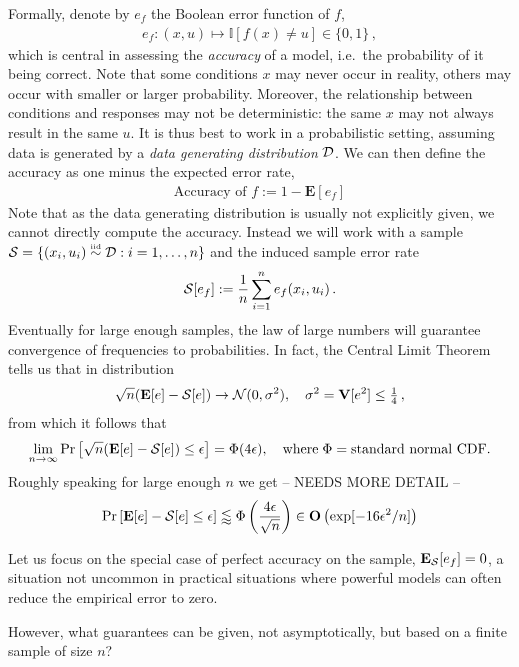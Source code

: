 \documentclass[12pt,a4paper]{article}
\begin{document}
\noindent Formally, denote by $e_f$ the Boolean error function of $f$,
\begin{align}
    e_f: (x,u) \mapsto \mathbb{I}[f(x) \neq u] \in \{0,1\}\,,
\end{align}
which is central in assessing the  \textit{accuracy} of a model, i.e.~the probability of it being correct. Note that some conditions $x$ may never occur in reality, others may occur with smaller or larger probability. Moreover, the relationship between conditions and responses may not be deterministic: the same $x$ may not always result in the same $u$.  It is thus best to work in a probabilistic setting, assuming data is generated by a  \textit{data generating distribution} $\mathcal D$. We can then define the accuracy as one minus the expected error rate, 
\begin{align}
    \text{Accuracy of $f$} := 1- \mathbf{E}[e_f]
\end{align}
Note that as the data generating distribution is usually not explicitly given, we cannot directly compute the accuracy. Instead we will work with a sample $\mathcal{S}= \{(x_i,u_i) \stackrel{\text{\tiny  iid}}\sim \mathcal D: i=1,\dots,n\}$ and the induced  sample error rate 
\begin{align}
    \mathcal {S}[e_f] := \frac{1}{n} \sum_{i=1}^n e_f(x_i,u_i)\,.
\end{align}
Eventually for large enough samples, the law of large numbers will guarantee convergence of frequencies to probabilities. In fact, the Central Limit Theorem tells us that in distribution 
\begin{align}
\sqrt n (\mathbf E[e] - \mathcal S[e]) \stackrel{}\to \mathcal N(0,\sigma^2), \quad \sigma^2 = \mathbf{V}[e^2] \le \tfrac 14\,,
\end{align}
from which it follows that
\begin{align}
\lim_{n \to \infty} \Pr\left[ \sqrt n (\mathbf E[e] - \mathcal S[e] ) \le \epsilon \right] = \Phi(4\epsilon), \quad \text{where} \; \Phi = \text{standard normal CDF}.
\end{align}
Roughly speaking for large enough $n$ we get -- NEEDS MORE DETAIL --
\begin{align}
\Pr\left[ \mathbf E[e] - \mathcal S[e] \le \epsilon \right] \lessapprox \Phi\left(\frac{4 \epsilon}{\sqrt n} \right) \in \mathbf O\left( \exp[-16\epsilon^2/n]\right)
\end{align}



Let us focus on the special case of perfect accuracy on the sample, $\mathbf E_{\mathcal S}[e_f]=0$, a situation not uncommon in practical situations where powerful models can often reduce the empirical error to zero. 




\newpage






However, what guarantees can be given, not asymptotically, but based on a finite sample of size $n$?
\end{document}

